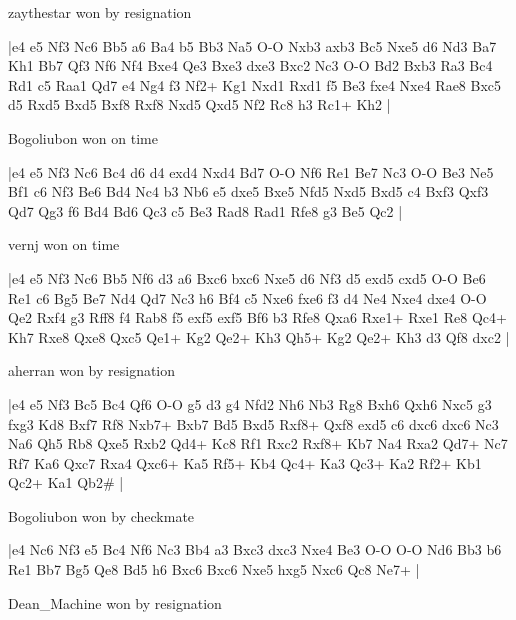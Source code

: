 \showboard

zaythestar won by resignation

\makegametitle
|e4 e5 Nf3 Nc6 Bb5 a6 Ba4 b5 Bb3 Na5 O-O Nxb3 axb3 Bc5 Nxe5 d6 Nd3 Ba7 Kh1 Bb7 Qf3 Nf6 Nf4 Bxe4 Qe3 Bxe3 dxe3 Bxc2 Nc3 O-O Bd2 Bxb3 Ra3 Bc4 Rd1 c5 Raa1 Qd7 e4 Ng4 f3 Nf2+ Kg1 Nxd1 Rxd1 f5 Be3 fxe4 Nxe4 Rae8 Bxc5 d5 Rxd5 Bxd5 Bxf8 Rxf8 Nxd5 Qxd5 Nf2 Rc8 h3 Rc1+ Kh2  |

\showboard

Bogoliubon won on time

\makegametitle
|e4 e5 Nf3 Nc6 Bc4 d6 d4 exd4 Nxd4 Bd7 O-O Nf6 Re1 Be7 Nc3 O-O Be3 Ne5 Bf1 c6 Nf3 Be6 Bd4 Nc4 b3 Nb6 e5 dxe5 Bxe5 Nfd5 Nxd5 Bxd5 c4 Bxf3 Qxf3 Qd7 Qg3 f6 Bd4 Bd6 Qc3 c5 Be3 Rad8 Rad1 Rfe8 g3 Be5 Qc2  |

\showboard

vernj won on time

\makegametitle
|e4 e5 Nf3 Nc6 Bb5 Nf6 d3 a6 Bxc6 bxc6 Nxe5 d6 Nf3 d5 exd5 cxd5 O-O Be6 Re1 c6 Bg5 Be7 Nd4 Qd7 Nc3 h6 Bf4 c5 Nxe6 fxe6 f3 d4 Ne4 Nxe4 dxe4 O-O Qe2 Rxf4 g3 Rff8 f4 Rab8 f5 exf5 exf5 Bf6 b3 Rfe8 Qxa6 Rxe1+ Rxe1 Re8 Qc4+ Kh7 Rxe8 Qxe8 Qxc5 Qe1+ Kg2 Qe2+ Kh3 Qh5+ Kg2 Qe2+ Kh3 d3 Qf8 dxc2  |

\showboard

aherran won by resignation

\makegametitle
|e4 e5 Nf3 Bc5 Bc4 Qf6 O-O g5 d3 g4 Nfd2 Nh6 Nb3 Rg8 Bxh6 Qxh6 Nxc5 g3 fxg3 Kd8 Bxf7 Rf8 Nxb7+ Bxb7 Bd5 Bxd5 Rxf8+ Qxf8 exd5 c6 dxc6 dxc6 Nc3 Na6 Qh5 Rb8 Qxe5 Rxb2 Qd4+ Kc8 Rf1 Rxc2 Rxf8+ Kb7 Na4 Rxa2 Qd7+ Nc7 Rf7 Ka6 Qxc7 Rxa4 Qxc6+ Ka5 Rf5+ Kb4 Qc4+ Ka3 Qc3+ Ka2 Rf2+ Kb1 Qc2+ Ka1 Qb2\#  |

\showboard

Bogoliubon won by checkmate

\makegametitle
|e4 Nc6 Nf3 e5 Bc4 Nf6 Nc3 Bb4 a3 Bxc3 dxc3 Nxe4 Be3 O-O O-O Nd6 Bb3 b6 Re1 Bb7 Bg5 Qe8 Bd5 h6 Bxc6 Bxc6 Nxe5 hxg5 Nxc6 Qc8 Ne7+  |

\showboard

Dean\_Machine won by resignation

